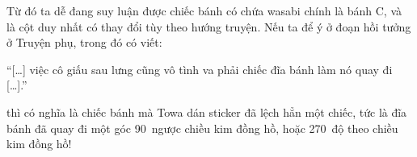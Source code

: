 \documentclass[../main.tex]{subfiles}
\begin{document}
Từ đó ta dễ đang suy luận được chiếc bánh có chứa wasabi chính là bánh C, và là cột duy nhất có thay đổi tùy theo hướng truyện. Nếu ta để ý ở đoạn hồi tưởng ở {\abv Truyện phụ}, trong đó có viết:

\begin{center}
  ``[\dots] việc cô giấu sau lưng cũng vô tình va phải chiếc đĩa bánh làm nó quay đi [\dots].''
\end{center}

thì có nghĩa là chiếc bánh mà Towa dán sticker đã lệch hẳn một chiếc, tức là đĩa bánh đã quay đi một góc 90\degree\ ngược chiều kim đồng hồ, hoặc 270\degree\ độ theo chiều kim đồng hồ!
\end{document}
